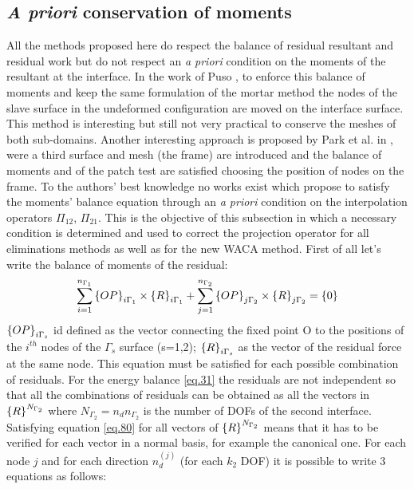 \subsection{\textit{A priori} conservation of moments}\label{ssec37}
All the methods proposed here do respect the balance of residual resultant and residual work but do not respect an \textit{a priori} condition on the moments of the resultant at the interface. In the work of Puso \cite{puso20043d}, to enforce this balance of moments and keep the same formulation of the mortar method the nodes of the slave surface in the undeformed configuration are moved on the interface surface. This method is interesting but still not very practical to conserve the meshes of both sub-domains. Another interesting approach is proposed by  Park et al. in \cite{park2002simpl}, were a third surface and mesh (the frame) are introduced and the balance of moments and of the patch test are satisfied choosing the position of nodes on the frame. To the authors' best knowledge no works exist which propose to satisfy the moments' balance equation through an \textit{a priori} condition on the interpolation operators $\Pi_{12}$, $\Pi_{21}$. This is the objective of this subsection in which a necessary condition is determined and used to correct the projection operator for all eliminations methods as well as for the new WACA method.
First of all let’s write the balance of moments of the residual:
\begin{equation}
\label{eq.80}
\sum_{i=1}^{n_{\Gamma_1}}\left\lbrace{OP}\right \rbrace_{i\Gamma_1}\times \left\lbrace{R}\right \rbrace_{i\Gamma_1}+\sum_{j=1}^{n_{\Gamma_2}}\left\lbrace{OP}\right \rbrace_{j\Gamma_2}\times \left\lbrace{R}\right \rbrace_{j\Gamma_2}=\left\lbrace{0}\right \rbrace
\end{equation}
 $\left\lbrace{OP}\right \rbrace_{i\Gamma_s}$ id defined as the vector connecting the fixed point O to the positions of the $i^{th}$ nodes of the $\Gamma_s$ surface (s=1,2); $\left\lbrace{R}\right \rbrace_{i\Gamma_s}$ as the vector of the residual force at the same node. This equation must be satisfied for each possible combination of residuals. For the energy balance \eqref{eq.31} the residuals are not independent so that all the combinations of residuals can be obtained as all the vectors in $\left\lbrace{R}\right \rbrace^{N_{\Gamma_2}}$ where $N_{\Gamma_2}=n_d n_{\Gamma_2}$ is the number of DOFs of the second interface. Satisfying equation \eqref{eq.80} for all vectors of $\left\lbrace{R}\right \rbrace^{N_{\Gamma_2}}$ means that it has to be verified for each vector in a normal basis, for example the canonical one.
For each node $j$ and for each direction $n_d^{(j)}$ (for each $k_2$ DOF) it is possible to write 3 equations as follows: 
